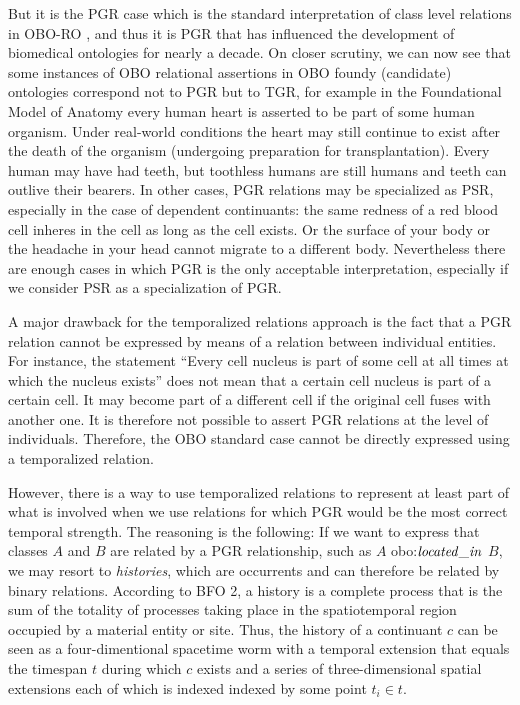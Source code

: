But it is the PGR case which is the standard interpretation of class level 
relations in OBO-RO \cite{OBO:RO}, and thus it is PGR that has influenced the development of biomedical ontologies 
for nearly a decade. On closer scrutiny, we can now see that some instances of OBO 
relational assertions in OBO foundy (candidate) ontologies \cite{Smith2007} correspond not to PGR but to TGR, for example in the Foundational Model of Anatomy 
every human heart is asserted to be part of some human organism. Under real-world conditions the heart may still continue to exist 
after the death of the organism (undergoing preparation for transplantation). 
Every human may have had teeth, but toothless humans are still humans and teeth can outlive their bearers. 
In other cases, PGR relations may be specialized as PSR, especially in the case of dependent continuants: 
the same redness of a red blood cell inheres in the cell as long as the cell exists. 
Or the surface of your body or the headache in your head cannot migrate to 
a different body. Nevertheless there are enough cases in which PGR is the only acceptable interpretation, 
especially if we consider PSR as a specialization of PGR.

A major drawback for the temporalized relations approach is the fact that a PGR relation cannot be expressed 
by means of a relation between individual entities. For instance, the statement ``Every cell 
nucleus is part of some cell at all times at which the nucleus exists'' does not mean that a certain cell nucleus is part of a 
certain cell. It may become part of a different cell if the original cell fuses with another one. 
It is therefore not possible to assert PGR relations at the level of individuals. 
Therefore, the OBO standard case cannot be directly expressed using a temporalized relation.

However, there is a way to use temporalized relations to represent at least part of what is 
involved when we use relations for which PGR would be the most correct temporal strength.
The reasoning is the following: If we want to express that classes $A$ and $B$ are related by a PGR 
relationship, such as $A$ obo:$\mathit{located\_in}$ $B$, we may resort to 
\emph{histories}, which are occurrents and can therefore be related by binary relations. According 
to BFO 2, a history is a complete process that is the sum of the totality of processes taking place 
in the spatiotemporal region occupied by a material entity or site. Thus, the history of a continuant 
$c$ can be seen as a four-dimentional spacetime worm with a temporal extension that equals the 
timespan $t$ during which $c$ exists and a series of three-dimensional spatial extensions each 
of which is indexed indexed by some point 
$t_i \in t$. 

